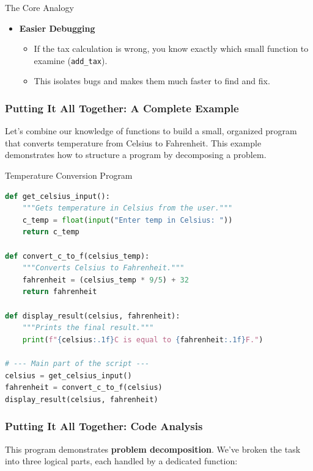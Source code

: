 \documentclass{beamer}
\begin{document}
\begin{frame}[fragile]
\begin{block}{The Core Analogy}
\begin{frame}
\begin{itemize}
        \vspace{0.5cm}
        
        \item \textbf{Easier Debugging}
        \begin{itemize}
            \item If the tax calculation is wrong, you know exactly which small function to examine (\texttt{add\_tax}).
            \item This isolates bugs and makes them much faster to find and fix.
        \end{itemize}
    \end{itemize}
    
\end{frame}

\begin{frame}[fragile]
    \frametitle{Putting It All Together: A Complete Example}
    
    Let's combine our knowledge of functions to build a small, organized program that converts temperature from Celsius to Fahrenheit. This example demonstrates how to structure a program by decomposing a problem.
    
    \begin{block}{Temperature Conversion Program}
\begin{lstlisting}[language=Python]
def get_celsius_input():
    """Gets temperature in Celsius from the user."""
    c_temp = float(input("Enter temp in Celsius: "))
    return c_temp

def convert_c_to_f(celsius_temp):
    """Converts Celsius to Fahrenheit."""
    fahrenheit = (celsius_temp * 9/5) + 32
    return fahrenheit

def display_result(celsius, fahrenheit):
    """Prints the final result."""
    print(f"{celsius:.1f}C is equal to {fahrenheit:.1f}F.")

# --- Main part of the script ---
celsius = get_celsius_input()
fahrenheit = convert_c_to_f(celsius)
display_result(celsius, fahrenheit)
\end{lstlisting}
    \end{block}
\end{frame}

\begin{frame}[fragile]
    \frametitle{Putting It All Together: Code Analysis}
    
    This program demonstrates \textbf{problem decomposition}. We've broken the task into three logical parts, each handled by a dedicated function:
    

\end{frame}
\end{block}
\end{frame}
\end{document}
